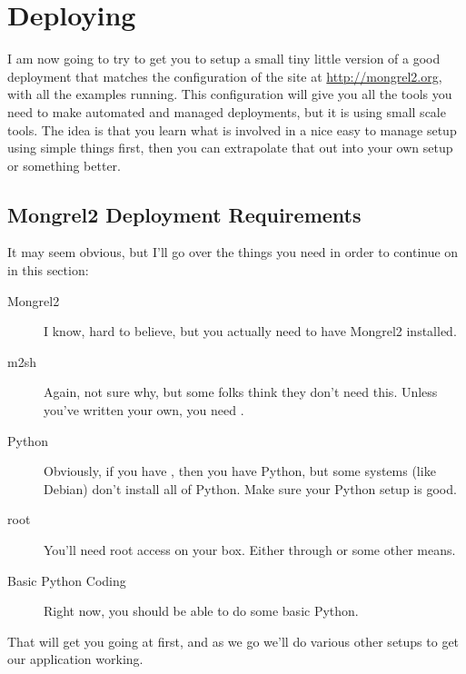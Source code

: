 \chapter{Deploying}

I am now going to try to get you to setup a small tiny little version of a good
deployment that matches the configuration of the site at \url{http://mongrel2.org}, with
all the examples running.  This configuration will give you all the tools you
need to make automated and managed deployments, but it is using small scale tools.
The idea is that you learn what is involved in a nice easy to manage setup using simple
things first, then you can extrapolate that out into your own setup or something
better.


\section{Mongrel2 Deployment Requirements}

It may seem obvious, but I'll go over the things you need in order to continue
on in this section:

\begin{description}
\item [Mongrel2] I know, hard to believe, but you actually need to have Mongrel2 installed.
\item [m2sh] Again, not sure why, but some folks think they don't need this.  Unless you've
    written your own, you need .
\item [Python] Obviously, if you have , then you have Python, but some systems
    (like Debian) don't install all of Python.  Make sure your Python setup is good.
\item [root] You'll need root access on your box.  Either through  or some other means.
\item [Basic Python Coding] Right now, you should be able to do some basic Python.
\end{description}

That will get you going at first, and as we go we'll do various other setups to
get our application working.

